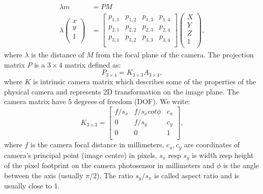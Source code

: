 \begin{equation}
  \begin{aligned}
	\lambda m&= PM \\
	\lambda
	\begin{pmatrix}
		x \\
		y \\
		1 \\
	\end{pmatrix}
	&=
	\begin{bmatrix}
		p_{1,1} & p_{1,2} & p_{1,3}  & p_{1,4} \\
		p_{2,1} & p_{2,2} & p_{2,3}  & p_{2,4} \\
		p_{3,1} & p_{3,2} & p_{3,3}  & p_{3,4} \\
	\end{bmatrix}
	\begin{pmatrix}
		X \\
		Y \\
		Z \\
		1 \\
	\end{pmatrix},
	\end{aligned}
	\label{eq:point-projection}
\end{equation}
where $\lambda$ is the distance of $M$ from the focal plane of the camera. The projection matrix $P$ is a $3 \times 4$ matrix defined as:
\begin{equation}
	P_{3 \times 4}= K_{3 \times 3}A_{3 \times 4},
\end{equation}
where $K$ is intrinsic camera matrix which describes some of the properties of the physical camera and represents 2D transformation on the image plane. The camera matrix have 5 degrees of freedom (DOF). We write:
\begin{equation}
	K_{3 \times 3} = 
	\begin{bmatrix}
		f/s_x & f/s_x  cot \phi & c_x \\
		0 & f/s_y & c_y \\
		0 & 0  & 1 \\
	\end{bmatrix},
\end{equation}
where $f$ is the camera focal distance in millimeters, $c_x, c_y$ are coordinates of camera's principal point (image centre) in pixels, $s_x$ resp $s_y$ is width resp height of the pixel footprint on the camera photosensor in millimeters and $\phi$ is the angle between the axis (usually $\pi /2$). The ratio $s_y/s_x$ is called aspect ratio and is usually close to 1.

